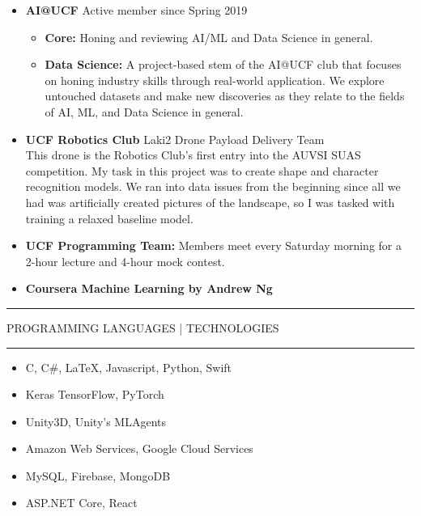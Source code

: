 \documentclass{article}
\newcommand{\makesection}[1]{\hrule\vskip1mm\uppercase{#1}\vskip1mm\hrule}
\begin{document}
\begin{itemize}[leftmargin=.35cm]
    \item \textbf{AI@UCF} Active member since Spring 2019
    \begin{itemize}[$\circ$]
        \item \textbf{Core:} Honing and reviewing AI/ML and Data Science in general.
        \item \textbf{Data Science:} A project-based stem of the AI@UCF club that focuses on honing industry skills through real-world application. We explore untouched datasets and make new discoveries as they relate to the fields of AI, ML, and Data Science in general.
    \end{itemize}
    \item \textbf{UCF Robotics Club} Laki2 Drone Payload Delivery Team \\
    This drone is the Robotics Club's first entry into the AUVSI SUAS competition. My task in this project was to create shape and character recognition models. We ran into data issues from the beginning since all we had was artificially created pictures of the landscape, so I was tasked with training a relaxed baseline model.
    \item \textbf{UCF Programming Team:} Members meet every Saturday morning for a 2-hour lecture and 4-hour mock contest.
    \item \textbf{Coursera Machine Learning by Andrew Ng}
\end{itemize}
    
\makesection{Programming Languages | Technologies}
\vspace*{-2mm}
\begin{multicols}{2}\begin{itemize}[leftmargin=.35cm]
    \setlength\itemsep{-.1cm}
    \item C, C\#, \LaTeX, Javascript, Python, Swift
    \item Keras TensorFlow, PyTorch
    \item Unity3D, Unity's MLAgents
    \item Amazon Web Services, Google Cloud Services
    \item MySQL, Firebase, MongoDB
    \item ASP.NET Core, React
\end{itemize}\end{multicols}
\end{document}
